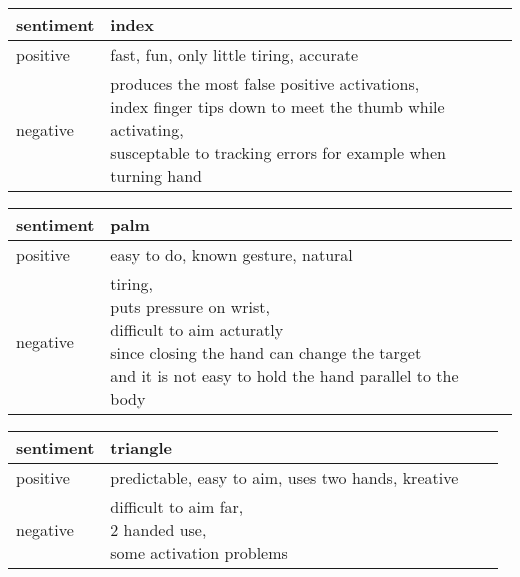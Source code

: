 \begin{table}[]
\begin{tabular}{llll}
\hline
sentiment &
    index \\ \hline
\multicolumn{1}{|l|}{positive} &
    \multicolumn{1}{l|}{fast, fun, only little tiring, accurate } \\ \hline
negative &
    \makecell{produces the most false positive activations, \\index finger tips down to meet the thumb while activating, \\susceptable to tracking errors for example when turning hand} \\ \hline
\end{tabular}%
\label{tbl:interview1}
\end{table}

\begin{table}[]
\begin{tabular}{llll}
\hline
sentiment &
    palm \\ \hline
\multicolumn{1}{|l|}{positive} &
    \multicolumn{1}{l|}{easy to do, known gesture, natural} \\ \hline
negative &
    \makecell{tiring,\\ puts pressure on wrist,\\ difficult to aim acturatly \\ since closing the hand can change the target\\ and it is not easy to hold the hand parallel to the body} \\ \hline
\end{tabular}%
\label{tbl:interview2}
\end{table}

\begin{table}[]
\begin{tabular}{llll}
\hline
sentiment &
    triangle \\ \hline
\multicolumn{1}{|l|}{positive} &
    \multicolumn{1}{l|}{predictable, easy to aim, uses two hands, kreative} \\ \hline
negative &
    \makecell{difficult to aim far,\\ 2 handed use,\\ some activation problems} \\ \hline
\end{tabular}%
\label{tbl:interview3}
\end{table}


